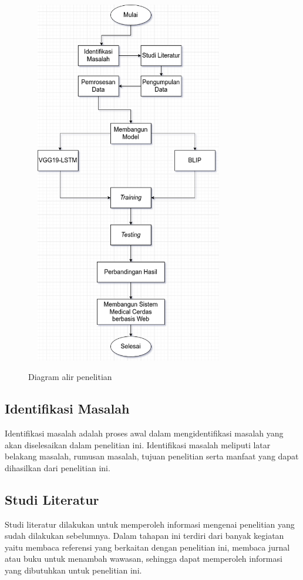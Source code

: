 \begin{figure}[H]
\centering
{\includegraphics [width = 9cm, height= 16cm]{image/bab3/diagram_alir_penelitian8}}
\caption{Diagram alir penelitian}
\label{alur_penelitian}
\end{figure}

\subsection{Identifikasi Masalah}

\par Identifikasi masalah adalah proses awal dalam mengidentifikasi masalah yang akan diselesaikan dalam penelitian ini. Identifikasi masalah meliputi latar belakang masalah, rumusan masalah, tujuan penelitian serta manfaat yang dapat dihasilkan dari penelitian ini.

\subsection{Studi Literatur}

\par Studi literatur dilakukan untuk memperoleh informasi mengenai penelitian yang sudah dilakukan sebelumnya. Dalam tahapan ini terdiri dari banyak kegiatan yaitu membaca referensi yang berkaitan dengan penelitian ini, membaca jurnal atau buku untuk menambah wawasan, sehingga dapat memperoleh informasi yang dibutuhkan untuk penelitian ini.



